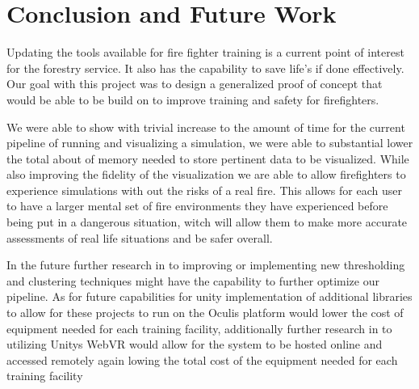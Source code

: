 
\chapter{Conclusion and Future Work} %

\label{Chapter4} %

Updating the tools available for fire fighter training is a current point of interest for the forestry service. It also has the capability to save life's if done effectively. Our goal with this project was to  design a generalized proof of concept that would be able to be build on to improve training and safety for firefighters. \par
We were able to show with trivial increase to the amount of time for the current pipeline of running and visualizing a simulation, we  were able to substantial lower the total about of memory needed to store pertinent data to be visualized. While also improving the fidelity of the visualization we are able to allow firefighters to experience simulations with out the risks of a real fire. This allows for each user to have a larger mental set of fire environments they have experienced before being put in a dangerous situation, witch will allow them to make more accurate assessments of real life situations and be safer overall. \par

In the future further research in to improving or implementing new thresholding and clustering techniques might have the capability to further optimize our pipeline. As for future capabilities for unity implementation of additional libraries to allow for these projects to run on the Oculis platform would lower the cost of equipment needed for each training facility, additionally further research in to utilizing Unitys WebVR would allow for the system to be hosted online and accessed remotely again lowing the total cost of the equipment needed for each training facility    

